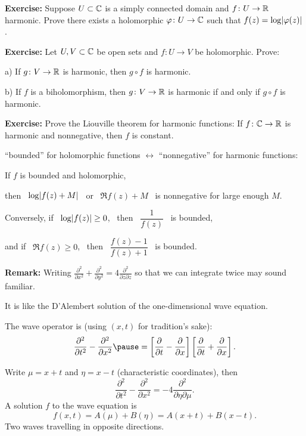 \documentclass[10pt,aspectratio=169]{beamer}
\begin{document}
\begin{frame}
\textbf{Exercise:}
Suppose $U \subset {\mathbb{C}}$ is a simply connected domain
and $f \colon U \to {\mathbb{R}}$ harmonic.  Prove there exists
a holomorphic $\varphi \colon U \to {\mathbb{C}}$ such that
$f(z) = \log \lvert {\varphi(z)} \rvert$.

\medskip
\pause

\textbf{Exercise:}
Let $U,V \subset {\mathbb{C}}$ be open sets and
$f \colon U \to V$ be holomorphic. Prove:

a)
If $g \colon V \to {\mathbb{R}}$ is harmonic, then
$g \circ f$ is harmonic.

b)
If $f$ is a biholomorphism,
then $g \colon V \to {\mathbb{R}}$ is harmonic if and only if
$g \circ f$ is harmonic.

\medskip
\pause

\textbf{Exercise:}
Prove the Liouville theorem for
harmonic functions:  If $f \colon {\mathbb{C}} \to {\mathbb{R}}$ is harmonic
and nonnegative, then $f$ is constant.

\bigskip
\pause

``bounded'' for holomorphic functions
\quad $\leftrightarrow$ \quad
``nonnegative'' for harmonic functions:

\medskip
\pause

If $f$ is bounded and holomorphic,

then ~$\log \lvert {f(z)+M} \rvert$~ or ~$\Re f(z) + M$~
is nonnegative for large enough $M$.

\medskip
\pause

Conversely, if ~$\log \lvert {f(z)} \rvert \geq 0$,~
then ~$\dfrac{1}{f(z)}$~ is bounded,

and if ~$\Re f(z) \geq 0$,~
then ~$\dfrac{f(z)-1}{f(z)+1}$~ is bounded.
%



\end{frame}

\begin{frame}
\textbf{Remark:}
Writing
$\displaystyle
\frac{\partial^2}{\partial x^2}+ \frac{\partial^2}{\partial y^2} = 
4 \frac{\partial^2}{\partial \bar{z} \partial z}$
so that we can integrate twice may sound familiar.

\medskip
\pause

It is like the D'Alembert solution of the one-dimensional wave equation.

\medskip
\pause

The wave operator is
(using $(x,t)$ for tradition's sake):
\[
\frac{\partial^2}{\partial t^2}- \frac{\partial^2}{\partial x^2}
\pause
=
\left[ \frac{\partial}{\partial t}- \frac{\partial}{\partial x}
\right]
\left[ \frac{\partial}{\partial t}+ \frac{\partial}{\partial x}
\right].
\]

\medskip
\pause

Write $\mu = x+t$ and $\eta = x-t$ (characteristic coordinates), then
\[
\frac{\partial^2}{\partial t^2}- \frac{\partial^2}{\partial x^2} =
-4 \frac{\partial^2}{\partial \eta \partial \mu} .
\]
\pause
A solution $f$ to the wave equation is
\[
f(x,t) = A(\mu) + B(\eta) = A(x+t)+B(x-t).
\]
\pause
Two waves travelling in opposite directions.

\end{frame}
\end{document}
